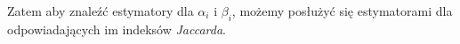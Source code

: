 Zatem aby znaleźć estymatory dla ${\alpha}_i$ i ${\beta}_i$, możemy posłużyć się estymatorami dla odpowiadających im indeksów \textit{Jaccarda}.


%
%
%
%
